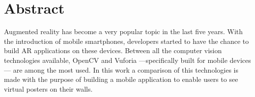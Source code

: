 \chapter{Abstract}
Augmented reality has become a very popular topic in the last five years. With
the introduction of mobile smartphones, developers started to have the chance
to build AR applications on these devices. Between all the computer vision
technologies available, OpenCV and Vuforia ---specifically built for mobile
devices--- are among the most used. In this work a comparison of this technologies
is made with the purpose of building a mobile application to enable users to see
virtual posters on their walls.
